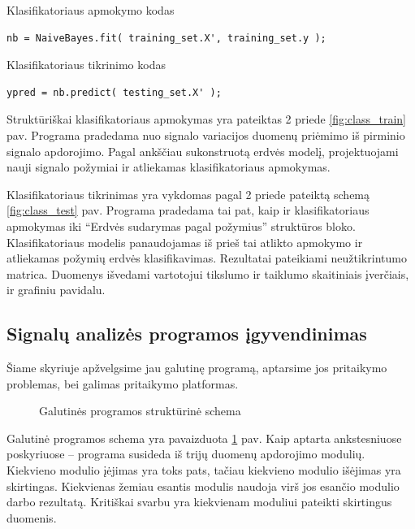 \documentclass[]{vgtuef}
\begin{document}
\begin{cfigure}
	\centering
	\caption{Klasifikatoriaus apmokymo kodas}
	\label{code:nb_training}
	\begin{lstlisting}
nb = NaiveBayes.fit( training_set.X', training_set.y );
  \end{lstlisting}
\end{cfigure}

\begin{cfigure}
	\centering
	\caption{Klasifikatoriaus tikrinimo kodas}
	\label{code:nb_testing}
	\begin{lstlisting}
ypred = nb.predict( testing_set.X' );
  \end{lstlisting}
\end{cfigure}

Struktūriškai klasifikatoriaus apmokymas yra pateiktas 2 priede \ref{fig:class_train} pav. Programa pradedama nuo signalo variacijos duomenų priėmimo iš pirminio signalo apdorojimo. Pagal ankščiau sukonstruotą erdvės modelį, projektuojami nauji signalo požymiai ir atliekamas klasifikatoriaus apmokymas.

Klasifikatoriaus tikrinimas yra vykdomas pagal 2 priede pateiktą schemą \ref{fig:class_test} pav. Programa pradedama tai pat, kaip ir klasifikatoriaus apmokymas iki ``Erdvės sudarymas pagal požymius'' struktūros bloko. Klasifikatoriaus modelis panaudojamas iš prieš tai atlikto apmokymo ir atliekamas požymių erdvės klasifikavimas. Rezultatai pateikiami neužtikrintumo matrica. Duomenys išvedami vartotojui tikslumo ir taiklumo skaitiniais įverčiais, ir grafiniu pavidalu.

\subsection{Signalų analizės programos įgyvendinimas}
\label{subsec:total_program}

Šiame skyriuje apžvelgsime jau galutinę programą, aptarsime jos pritaikymo problemas, bei galimas pritaikymo platformas.

\begin{figure}
  \centering
  
  \caption{Galutinės programos struktūrinė schema}
  \label{fig:galutine_programa}
\end{figure}

Galutinė programos schema yra pavaizduota \ref{fig:galutine_programa} pav. Kaip aptarta ankstesniuose poskyriuose -- programa susideda iš trijų duomenų apdorojimo modulių. Kiekvieno modulio įėjimas yra toks pats, tačiau kiekvieno modulio išėjimas yra skirtingas. Kiekvienas žemiau esantis modulis naudoja virš jos esančio modulio darbo rezultatą. Kritiškai svarbu yra kiekvienam moduliui pateikti skirtingus duomenis.
\end{document}
